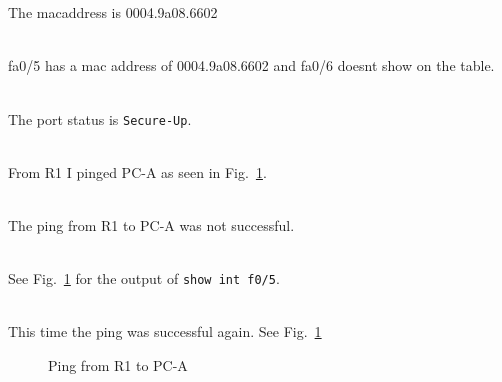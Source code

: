 \documentclass[../EngineeringJournal_CDavis.tex]{subfiles}
\begin{document}
\clearpage

\noindent{}\\


\\
The macaddress is 0004.9a08.6602


\\
fa0/5 has a mac address of 0004.9a08.6602 and fa0/6 doesnt show on the table.


\\
The port status is {\scriptsize{\verb$Secure-Up$}\normalsize}.


\\
From R1 I pinged PC-A as seen in Fig.~\ref{R1ping10}.


\\
The ping from R1 to PC-A was not successful. 


\\
See Fig.~\ref{R1ping10} for the output of
{\scriptsize{\verb$show int f0/5$}\normalsize}.


\\
This time the ping was successful again. See
Fig.~\ref{R1ping10}


\begin{figure}[!hbt]\centering
{}\par
{}\par 
{}\par 
\caption{Ping from R1 to PC-A}\label{R1ping10}
\end{figure}
\end{document}
